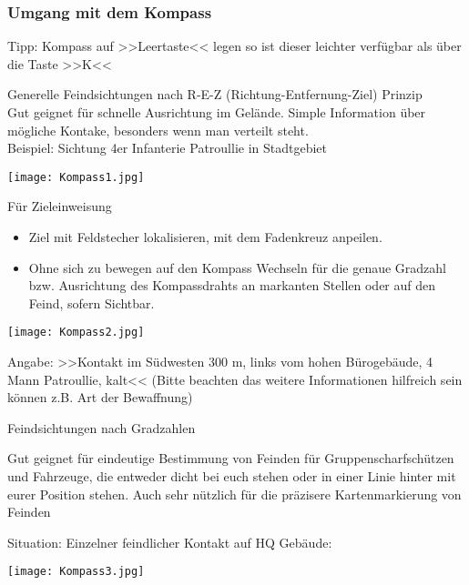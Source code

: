 \subsubsection{Umgang mit dem Kompass}

	Tipp: Kompass auf >>Leertaste<< legen so ist dieser leichter verfügbar als über die Taste >>K<<

	Generelle Feindsichtungen nach R-E-Z (Richtung-Entfernung-Ziel) Prinzip \\

	Gut geignet für schnelle Ausrichtung im Gelände. Simple Information über mögliche Kontake, besonders wenn man verteilt steht. \\


	Beispiel: Sichtung 4er Infanterie Patroullie in Stadtgebiet \\
\begin{minipage}[t]{1\textwidth}
	\texttt{[image: Kompass1.jpg]}
\end{minipage}

	Für Zieleinweisung
		\begin{itemize}
 			\item Ziel mit Feldstecher lokalisieren, mit dem Fadenkreuz anpeilen.
			\item Ohne sich zu bewegen auf den Kompass Wechseln für die genaue Gradzahl bzw. Ausrichtung des Kompassdrahts an markanten Stellen oder auf den Feind, sofern Sichtbar.
		\end{itemize}

\begin{minipage}[t]{1\textwidth}
	\texttt{[image: Kompass2.jpg]}
\end{minipage}

	Angabe: >>Kontakt im Südwesten 300 m, links vom hohen Bürogebäude, 4 Mann Patroullie, kalt<< (Bitte beachten das weitere Informationen hilfreich sein können z.B. Art der Bewaffnung)

	Feindsichtungen nach Gradzahlen

	Gut geignet für eindeutige Bestimmung von Feinden für Gruppenscharfschützen und Fahrzeuge, die entweder dicht bei euch stehen oder in einer Linie hinter mit eurer Position stehen. Auch sehr nützlich für die präzisere Kartenmarkierung von Feinden

 	Situation: Einzelner feindlicher Kontakt auf HQ Gebäude: \\
\begin{minipage}[t]{1\textwidth}
	\texttt{[image: Kompass3.jpg]}
\end{minipage}

